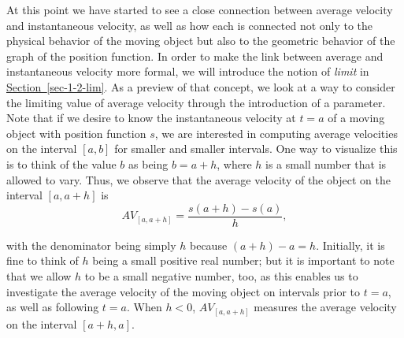 \documentclass[10pt,]{book}
\theoremstyle{plain}
\theoremstyle{definition}
\theoremstyle{definition}
\theoremstyle{definition}
\theoremstyle{definition}
\theoremstyle{definition}
\numberwithin{equation}{section}
\newcommand{\lt}{ < }
\begin{document}
At this point we have started to see a close connection between average velocity and instantaneous velocity, as well as how each is connected not only to the physical behavior of the moving object but also to the geometric behavior of the graph of the position function. In order to make the link between average and instantaneous velocity more formal, we will introduce the notion of \emph{limit} in \hyperref[sec-1-2-lim]{Section~\ref{sec-1-2-lim}}. As a preview of that concept, we look at a way to consider the limiting value of average velocity through the introduction of a parameter. Note that if we desire to know the instantaneous velocity at \(t = a\) of a moving object with position function \(s\), we are interested in computing average velocities on the interval \([a,b]\) for smaller and smaller intervals. One way to visualize this is to think of the value \(b\) as being \(b = a + h\), where \(h\) is a small number that is allowed to vary. Thus, we observe that the average velocity of the object on the interval \([a,a+h]\) is
%
\begin{equation*}
AV_{[a,a+h]} = \frac{s(a+h)-s(a)}{h},
\end{equation*}\par

with the denominator being simply \(h\) because \((a+h) - a = h\). Initially, it is fine to think of \(h\) being a small positive real number; but it is important to note that we allow \(h\) to be a small negative number, too, as this enables us to investigate the average velocity of the moving object on intervals prior to \(t = a\), as well as following \(t = a\). When \(h \lt  0\), \(AV_{[a,a+h]}\) measures the average velocity on the interval \([a+h,a]\).
%
\par
\end{document}
